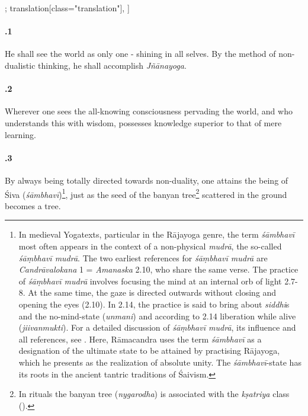 \begin{alignment}[
  texts=edition[class="edition"];
  translation[class="translation"],
  ]
\begin{translation}
\begin{tlate}[21_1]
       \paragraph{.1} He shall see the world as only one - shining in all selves. By the method of non-dualistic thinking, he shall accomplish \textit{Jñānayoga}.
     \end{tlate}
     \begin{tlate}[21_2]
       \paragraph{.2} Wherever one sees the all-knowing consciousness pervading the world, and who understands this with wisdom, possesses knowledge superior to that of mere learning.
     \end{tlate}
     \begin{tlate}[21_3]
       \paragraph{.3} By always being totally directed towards non-duality, one attains the being of Śiva (\textit{śāmbhavī})\footnote{In medieval Yogatexts, particular in the Rājayoga genre, the term \textit{śāmbhavī} most often appears in the context of a non-physical \textit{mudrā}, the so-called \textit{śāṃbhavī mudrā}. The two earliest references for \textit{śāṃbhavī mudrā} are \textit{Candrāvalokana} 1 = \textit{Amanaska} 2.10, who share the same verse. The practice of \textit{śāṃbhavī mudrā} involves focusing the mind at an internal orb of light  2.7-8. At the same time, the gaze is directed outwards without closing and opening the eyes  (2.10). In  2.14, the practice is said to bring about \textit{siddhi}s and the no-mind-state (\textit{unmani}) and according to  2.14 liberation while alive (\textit{jiivanmukti}). For a detailed discussion of \textit{śāṃbhavī mudrā}, its influence and all references, see \citeauthor[2013:71-79]{birch2013}. Here, Rāmacandra uses the term \textit{śāmbhavī} as a designation of the ultimate state to be attained by practising Rājayoga, which he presents as the realization of absolute unity. The \textit{śāmbhavī}-state has its roots in the ancient tantric traditions of Śaivism.}, just as the seed of the banyan tree\footnote{In rituals the banyan tree (\textit{nygarodha}) is associated with the \textit{kṣatriya} class (\citeauthor[1998:27]{smith1998}).} scattered in the ground becomes a tree.
     \end{tlate}
     \begin{tlate}[21_4]

\end{tlate}
\end{translation}
\end{alignment}

